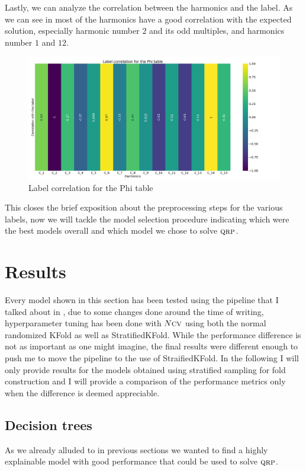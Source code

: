 Lastly, we can analyze the correlation between the harmonics and the label. As we can see in  most of the harmonics have a good correlation with the expected solution, especially harmonic number $2$ and its odd multiples, and harmonics number $1$ and $12$.
\begin{figure}[h!]
	\centering
	\includegraphics[width=\linewidth]{img/Phi_label_corr.png}
	\caption{Label correlation for the Phi table} \label{fig:phi-lcorr}
\end{figure}
This closes the brief exposition about the preprocessing steps for the various labels, now we will
tackle the model selection procedure indicating which were the best models overall and which model
we chose to solve $\textsc{qrp}$.

\section{Results}
Every model shown in this section has been tested using the pipeline that I talked about in
, due to some changes done around the time of writing, hyperparameter tuning has
been done with $N\textsc{cv}$ using both the normal randomized KFold as well as StratifiedKFold. While the
performance difference is not as important as one might imagine, the final results were different
enough to push me to move the pipeline to the use of StraifiedKFold. In the following I will only
provide results for the models obtained using stratified sampling for fold construction and I will
provide a comparison of the performance metrics only when the difference is deemed appreciable.

\subsection{Decision trees}
As we already alluded to in previous sections we wanted to find a highly explainable model with good
performance that could be used to solve $\textsc{qrp}$.

